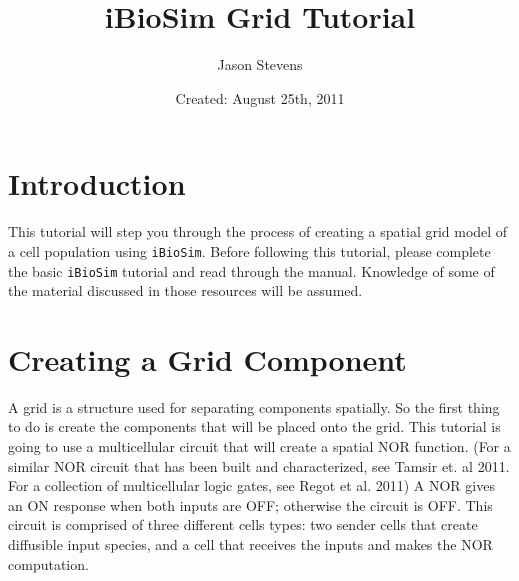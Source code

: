 \documentclass[titlepage,11pt]{article}
\title{iBioSim Grid Tutorial}
\author{Jason Stevens}
\date{Created: August 25th, 2011}
\begin{document}
\maketitle

  
\tableofcontents

\clearpage
  

\section{Introduction}

\noindent
This tutorial will step you through the process of creating a spatial grid model of a cell population using {\tt iBioSim}.  Before following this tutorial, please complete the basic {\tt iBioSim} tutorial and read through the manual.  Knowledge of some of the material discussed in those resources will be assumed.



\section{Creating a Grid Component}

\noindent
A grid is a structure used for separating components spatially.  So the first thing to do is create the components that will be placed onto the grid.  This tutorial is going to use a multicellular circuit that will create a spatial NOR function.  (For a similar NOR circuit that has been built and characterized, see Tamsir et. al 2011.  For a collection of multicellular logic gates, see Regot et al. 2011)  A NOR gives an ON response when both inputs are OFF; otherwise the circuit is OFF.  This circuit is comprised of three different cells types: two sender cells that create diffusible input species, and a cell that receives the inputs and makes the NOR computation.
\end{document}
